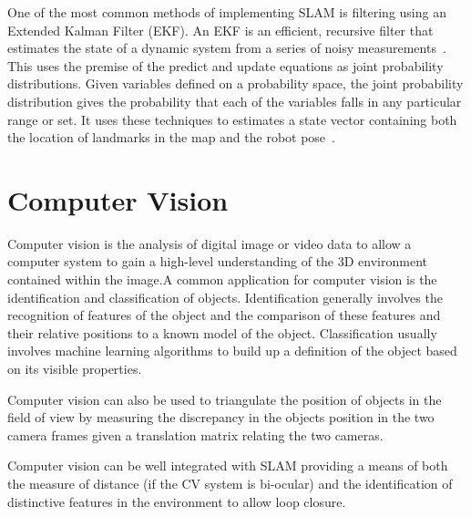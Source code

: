 One of the most common methods of implementing SLAM is filtering using an
Extended Kalman Filter (EKF). An EKF is an efficient, recursive filter
that estimates the state of a dynamic system from a series of noisy measurements~\cite{fox2003bayesian}.
This uses the premise of the predict and update equations as joint probability
distributions. Given variables defined on a probability space, the joint
probability distribution gives the probability that each of the variables falls in any
particular range or set. It uses these techniques to estimates a state vector containing
both the location of landmarks in the map and the robot pose~\cite{huang2007convergence}.


\section{Computer Vision}\label{litreview/cv}
Computer vision is the analysis of digital image or video data to allow a computer
system to gain a high-level understanding of the 3D environment contained within
the image\cite{CVBallard}.A common application for computer vision is the identification and classification
of objects. Identification generally involves the recognition of features of the
object and the comparison of these features and their relative positions to a
known model of the object. Classification usually involves machine learning
algorithms to build up a definition of the object based on its visible properties\cite{CVpaoletti2018new}.

Computer vision can also be used to triangulate the position of objects in the
field of view by measuring the discrepancy in the objects position in the two camera
frames given a translation matrix relating the two cameras.

Computer vision can be well integrated with SLAM providing a means of both the measure
of distance (if the CV system is bi-ocular) and the identification of distinctive
features in the environment to allow loop closure\cite{CVho2006loop}.